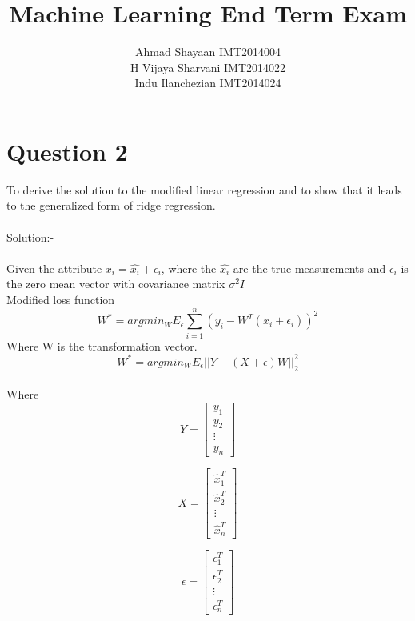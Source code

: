 \documentclass{article}
\title{Machine Learning End Term Exam}
\author{Ahmad Shayaan IMT2014004 \\ H Vijaya Sharvani IMT2014022 \\ Indu Ilanchezian IMT2014024}
\begin{document}
\maketitle
{}

\section*{Question 2}

To derive the solution to the modified linear regression and to show that it leads to the generalized form of ridge regression.
\\
\\
Solution:-
\\
\\
Given the attribute $x_i = \hat{x_i} + \epsilon_i $, where the $\hat{x_i}$ are the true measurements and $\epsilon_i$ is the zero mean vector with covariance matrix $\sigma^2 I$
\\
Modified loss function
\begin{equation*}
W^* = argmin_W E_\epsilon\sum_{i=1}^{n}(y_i - W^T(\hat{x_i} + \epsilon_i))^2
\end{equation*}
Where W is the transformation vector.
\begin{equation}
W^* = argmin_W E_\epsilon || Y - (X+\epsilon)W||_2^2 \tag{1}
\end{equation}
\\
Where
\begin{equation*}
	Y = \begin{bmatrix}
	y_1\\y_2\\\vdots\\y_n 
	\end{bmatrix}
\end{equation*}

\begin{equation*}
	X = \begin{bmatrix}
	\hat{x}_1^T\\\hat{x}_2^T\\\vdots\\\hat{x}_n^T
	\end{bmatrix}
\end{equation*}

\begin{equation*}
	\epsilon = \begin{bmatrix}
		\epsilon_1^T\\\epsilon_2^T\\\vdots\\\epsilon_n^T
	\end{bmatrix}
\end{equation*}
\end{document}
